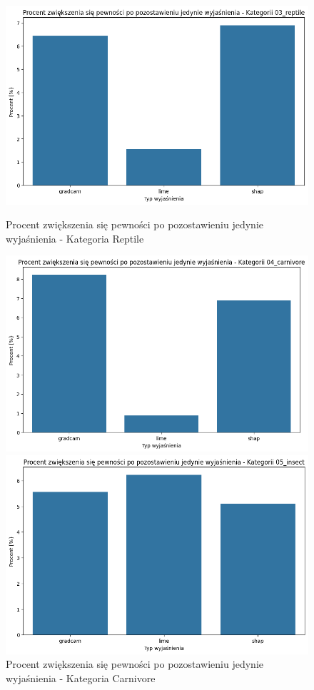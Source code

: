 \begin{figure}
	\centering
	\begin{minipage}[b]{0.3\textwidth}
		\centering\includegraphics[width=.9\textwidth]{img/base_confidence_womask_percent_reptile}
		\caption{Procent zwiększenia się pewności po pozostawieniu jedynie wyjaśnienia - Kategoria Reptile}  \label{rys:base_confidence_womask_percent_reptile}
	\end{minipage}
	\begin{minipage}[b]{0.3\textwidth}
		\centering\includegraphics[width=.9\textwidth]{img/base_confidence_womask_percent_carnivore}
		\caption{Procent zwiększenia się pewności po pozostawieniu jedynie wyjaśnienia - Kategoria Carnivore}  \label{rys:base_confidence_womask_percent_carnivore}
	\end{minipage}
	\begin{minipage}[b]{0.3\textwidth}
		\centering\includegraphics[width=.9\textwidth]{img/base_confidence_womask_percent_insect}

\end{minipage}
\end{figure}
